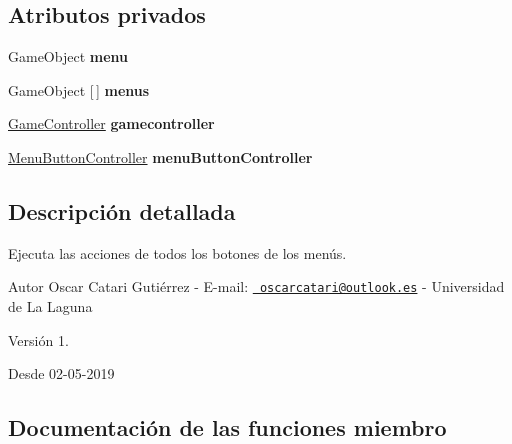 \subsection*{Atributos privados}
\begin{DoxyCompactItemize}
\item 
\mbox{\label{class_animator_functions_a162a21e1e1ea0b4dd25a93c98dc40b6d}} 
Game\+Object {\bfseries menu}
\item 
\mbox{\label{class_animator_functions_a775e25cebdeddf24c70df9cdff18d4e0}} 
Game\+Object \mbox{[}$\,$\mbox{]} {\bfseries menus}
\item 
\mbox{\label{class_animator_functions_a5312bb5dd4ccdf464994386a5456c6ba}} 
\mbox{\hyperlink{class_game_controller}{Game\+Controller}} {\bfseries gamecontroller}
\item 
\mbox{\label{class_animator_functions_a139b8fa3d653ca778f53b25371c4557b}} 
\mbox{\hyperlink{class_menu_button_controller}{Menu\+Button\+Controller}} {\bfseries menu\+Button\+Controller}
\end{DoxyCompactItemize}


\subsection{Descripción detallada}
Ejecuta las acciones de todos los botones de los menús. \begin{DoxyAuthor}{Autor}
Oscar Catari Gutiérrez -\/ E-\/mail\+: \href{mailto:oscarcatari@outlook.es}{\texttt{ oscarcatari@outlook.\+es}} -\/ Universidad de La Laguna 
\end{DoxyAuthor}
\begin{DoxyVersion}{Versión}
1. 
\end{DoxyVersion}
\begin{DoxySince}{Desde}
02-\/05-\/2019 
\end{DoxySince}


\subsection{Documentación de las funciones miembro}
\mbox{\label{class_animator_functions_a35a71ab86b80ff3826b04f1457e8b573}} 
